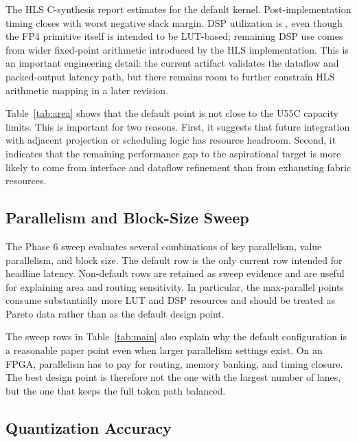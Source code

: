 \documentclass[conference]{IEEEtran}
\newcommand{\PaperRoot}{}
\renewcommand{\PaperRoot}{paper/}%
\renewcommand{\PaperRoot}{}%
\newcommand{\PaperInput}[1]{}
\begin{document}
The HLS C-synthesis report estimates \OursMxfpFourBThirtyTwoCsynthFmaxMhz for
the default kernel. Post-implementation timing closes with
\OursMxfpFourBThirtyTwoImplWnsNs worst negative slack margin. DSP utilization is
\OursMxfpFourBThirtyTwoDspPct, even though the FP4 primitive itself is intended
to be LUT-based; remaining DSP use comes from wider fixed-point arithmetic
introduced by the HLS implementation. This is an important engineering detail:
the current artifact validates the dataflow and packed-output latency path, but
there remains room to further constrain HLS arithmetic mapping in a later
revision.

\begin{table}[t]
  \centering
  \caption{Area breakdown for the default MXFP4 configuration.}
  \label{tab:area}
  \PaperInput{tables/area_breakdown.tex}
\end{table}

Table~\ref{tab:area} shows that the default point is not close to the U55C
capacity limits. This is important for two reasons. First, it suggests that
future integration with adjacent projection or scheduling logic has resource
headroom. Second, it indicates that the remaining performance gap to the
aspirational target is more likely to come from interface and dataflow
refinement than from exhausting fabric resources.

\subsection{Parallelism and Block-Size Sweep}

The Phase 6 sweep evaluates several combinations of key parallelism, value
parallelism, and block size. The default row is the only current row intended for
headline latency. Non-default rows are retained as sweep evidence and are useful
for explaining area and routing sensitivity. In particular, the max-parallel
points consume substantially more LUT and DSP resources and should be treated as
Pareto data rather than as the default design point.

The sweep rows in Table~\ref{tab:main} also explain why the default
configuration is a reasonable paper point even when larger parallelism settings
exist. On an FPGA, parallelism has to pay for routing, memory banking, and
timing closure. The best design point is therefore not the one with the largest
number of lanes, but the one that keeps the full token path balanced.

\subsection{Quantization Accuracy}
\end{document}
